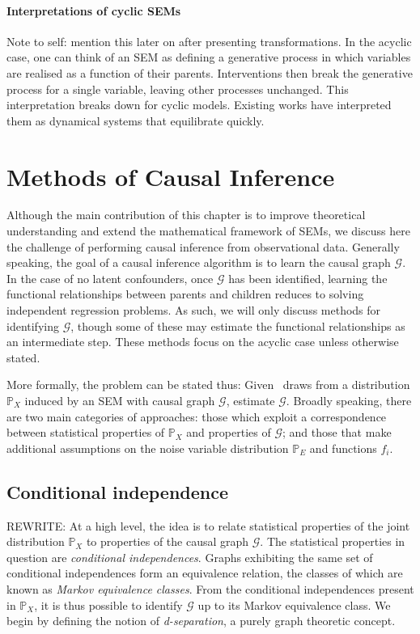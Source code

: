 \paragraph{Interpretations of cyclic SEMs}
Note to self: mention this later on after presenting transformations.
In the acyclic case, one can think of an SEM as defining a generative process in which variables are realised as a function of their parents. Interventions then break the generative process for a single variable, leaving other processes unchanged.
This interpretation breaks down for cyclic models. Existing works have interpreted them as dynamical systems that equilibrate quickly. 


\section{Methods of Causal Inference}

Although the main contribution of this chapter is to improve theoretical understanding and extend the mathematical framework of SEMs, we discuss here the challenge of performing causal inference from observational data. %
Generally speaking, the goal of a causal inference algorithm is to learn the causal graph $\mathcal{G}$. 
In the case of no latent confounders, once $\mathcal{G}$ has been identified, learning the functional relationships between parents and children reduces to solving independent regression problems. As such, we will only discuss methods for identifying $\mathcal{G}$, though some of these may estimate the functional relationships as an intermediate step.
These methods focus on the acyclic case unless otherwise stated.

More formally, the problem can be stated thus: Given \iid~draws from a distribution $\mathbb{P}_X$ induced by an SEM with causal graph $\mathcal{G}$, estimate $\mathcal{G}$.
Broadly speaking, there are two main categories of approaches: those which exploit a correspondence between statistical properties of $\mathbb{P}_X$ and properties of $\mathcal{G}$; and those that make additional assumptions on the noise variable distribution $\mathbb{P}_E$ and functions $f_i$.

\subsection{Conditional independence}

REWRITE:
At a high level, the idea is to relate statistical properties of the joint distribution $\mathbb{P}_X$ to properties of the causal graph $\mathcal{G}$.
The statistical properties in question are \emph{conditional independences}.
Graphs exhibiting the same set of conditional independences form an equivalence relation, the classes of which are known as \emph{Markov equivalence classes}.
From the conditional independences present in $\mathbb{P}_X$, it is thus possible to identify $\mathcal{G}$ up to its Markov equivalence class.
We begin by defining the notion of \emph{d-separation}, a purely graph theoretic concept. 
\\

